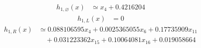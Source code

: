 \begin{equation}\begin{aligned}
h_{1,\varnothing}(x)&\simeq x_{4} + 0.4216204
\end{aligned}\label{eq:example-root}\end{equation}
\begin{equation}\begin{aligned}
h_{1,L}(x)&= 0
\end{aligned}\label{eq:example-constant}\end{equation}
\begin{equation}\begin{aligned}
h_{1,R}(x)&\simeq 0.088106595x_{4} + 0.0025365055x_{6} + 0.17735909x_{11}\\
&\quad + 0.031223362x_{15} + 0.10064081x_{16} + 0.019058664
\end{aligned}\label{eq:example-oblique}\end{equation}
